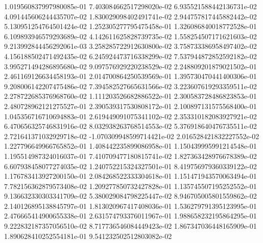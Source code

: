 1.019560837997980085e-01	7.403084662517298020e-02	6.935521588442136731e-02	4.091445606244435707e-02	1.830029098402491741e-02	2.944757817445882442e-02	5.130951254764501424e-02	1.252305277795475458e-01	1.326086840018772528e-01	6.109893946579293689e-02	4.142611625828739735e-02	1.558254507171621603e-02	9.213992844456292061e-03	3.258285722912630800e-02	3.758733386958497402e-02	4.156188502471492435e-02	6.245924473716338299e-02	7.537944872852592182e-02	3.995271494286895680e-02	9.097576929220238529e-02	2.248809201879021502e-01	2.461169126634458193e-01	2.014700864250539569e-01	1.395730470441400306e-01	9.208006142207475486e-02	7.394582527665631566e-02	3.223607619293359511e-02	2.278722685376968760e-02	1.111203526682886522e-01	2.300583728486823853e-01	2.480728962121275527e-01	2.390539317530808172e-01	2.100897131575568400e-01	1.045356716710694883e-01	2.619449091075341102e-02	2.353310182083927921e-02	6.470656325746831916e-02	8.032938263768514553e-02	5.376918640476735511e-02	2.721641371032929718e-02	-1.070309948599714421e-02	2.016528421832227552e-02	1.227796649966765852e-01	1.408442235899086958e-01	1.150439995991214548e-01	1.195514987324016037e-01	7.410709477180815741e-02	1.827363428976678389e-02	6.607938458077274035e-02	1.240752215324327501e-01	8.419756979360339122e-02	1.176783413927200150e-01	2.084268522333304618e-01	1.151471943570063494e-01	7.782156362879573408e-02	1.209277850732427828e-01	1.135745507195252552e-01	9.136632330303341709e-02	5.380029084798225447e-02	8.946705005801559862e-02	2.140126895138845797e-01	1.813020967417408036e-01	1.536279791395123995e-01	2.476665414900655338e-01	2.631574793376011967e-01	1.988658232195864295e-01	9.222832187357056510e-02	8.717736546084449423e-02	1.867347036448165909e-01	1.890628410252554181e-01	9.541232502512803082e-02

